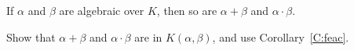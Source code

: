 \documentclass{ximera}
\begin{document}
\begin{corollary}
  If $\alpha$ and $\beta$ are algebraic over $K$, then so are
  $\alpha+\beta$ and $\alpha\cdot \beta$.
  \begin{sketch}
    Show that $\alpha+\beta$ and $\alpha\cdot \beta$ are in
    $K(\alpha,\beta)$, and use Corollary~\ref{C:feac}.
  \end{sketch}
\end{corollary}





    
\end{document}
